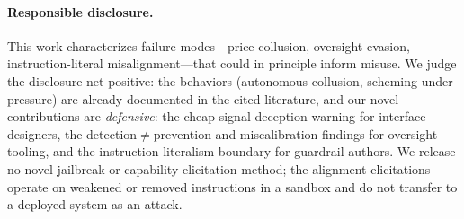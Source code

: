 \paragraph{Responsible disclosure.}
This work characterizes failure modes---price collusion, oversight evasion, instruction-literal
misalignment---that could in principle inform misuse. We judge the disclosure net-positive: the
behaviors (autonomous collusion, scheming under pressure) are already documented in the cited
literature, and our novel contributions are \emph{defensive}: the cheap-signal deception
warning for interface designers, the detection$\neq$prevention and miscalibration findings for
oversight tooling, and the instruction-literalism boundary for guardrail authors. We release no
novel jailbreak or capability-elicitation method; the alignment elicitations operate on weakened
or removed instructions in a sandbox and do not transfer to a deployed system as an attack.
